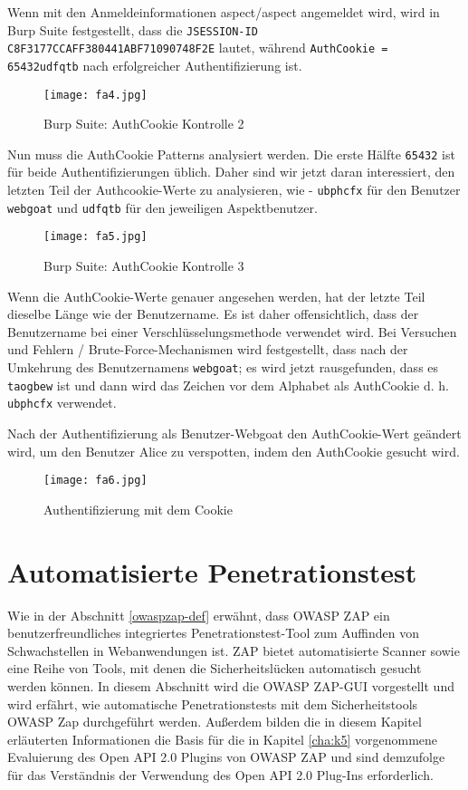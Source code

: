 Wenn mit den Anmeldeinformationen aspect/aspect angemeldet wird, wird in Burp Suite festgestellt, dass die \texttt{JSESSION-ID C8F3177CCAFF380441ABF71090748F2E} lautet, während \texttt{AuthCookie = 65432udfqtb} nach erfolgreicher Authentifizierung ist.

\newpage

\begin{figure}[h]
	\centering
	\texttt{[image: fa4.jpg]}
	\caption{Burp Suite: AuthCookie Kontrolle 2}
\end{figure}

Nun muss die AuthCookie Patterns analysiert werden. Die erste Hälfte \texttt{65432} ist für beide Authentifizierungen üblich. Daher sind wir jetzt daran interessiert, den letzten Teil der Authcookie-Werte zu analysieren, wie - \texttt{ubphcfx} für den Benutzer \texttt{webgoat} und \texttt{udfqtb} für den jeweiligen Aspektbenutzer.\\

\begin{figure}[h]
	\centering
	\texttt{[image: fa5.jpg]}
	\caption{Burp Suite: AuthCookie Kontrolle 3}
\end{figure}

Wenn die AuthCookie-Werte genauer angesehen werden, hat der letzte Teil dieselbe Länge wie der Benutzername. Es ist daher offensichtlich, dass der Benutzername bei einer Verschlüsselungsmethode verwendet wird. Bei Versuchen und Fehlern / Brute-Force-Mechanismen wird festgestellt, dass nach der Umkehrung des Benutzernamens \texttt{webgoat}; es wird jetzt rausgefunden, dass es \texttt{taogbew} ist und dann wird das Zeichen vor dem Alphabet als AuthCookie d. h. \texttt{ubphcfx} verwendet.

\newpage

Nach der Authentifizierung als Benutzer-Webgoat den AuthCookie-Wert geändert wird, um den Benutzer Alice zu verspotten, indem den AuthCookie gesucht wird.

\begin{figure}[h]
	\centering
	\texttt{[image: fa6.jpg]}
	\caption{Authentifizierung mit dem Cookie}
\end{figure}

\section{Automatisierte Penetrationstest}

Wie in der Abschnitt \ref{owaspzap-def} erwähnt, dass OWASP ZAP ein benutzerfreundliches integriertes Penetrationstest-Tool zum Auffinden von Schwachstellen in Webanwendungen ist. ZAP bietet automatisierte Scanner sowie eine Reihe von Tools, mit denen die Sicherheitslücken automatisch gesucht werden können. In diesem Abschnitt wird die OWASP ZAP-GUI vorgestellt und wird erfährt, wie automatische Penetrationstests mit dem Sicherheitstools OWASP Zap durchgeführt werden. Außerdem bilden die in diesem Kapitel erläuterten Informationen die Basis für die in Kapitel \ref{cha:k5} vorgenommene Evaluierung des Open API 2.0 Plugins von OWASP ZAP und sind demzufolge für das Verständnis der Verwendung des Open API 2.0 Plug-Ins erforderlich.

